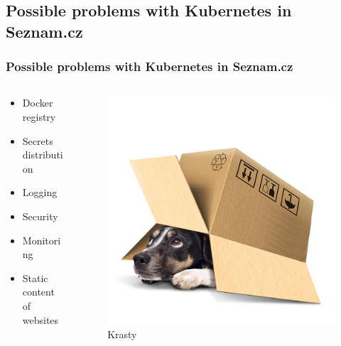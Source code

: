   \subsection*{Possible problems with Kubernetes in Seznam.cz}
    \begin{frame}
      \frametitle{Possible problems with Kubernetes in Seznam.cz}
      \begin{columns}
        \begin{column}{0.48\textwidth}
            \begin{itemize}
              \item Docker registry
              \item Secrets distribution
              \item Logging
              \item Security
              \item Monitoring
              \item Static content of websites
            \end{itemize}
          \end{column}  
          \begin{column}{0.48\textwidth}
            \begin{figure}[htb]
    				  \begin{center}
    					  \includegraphics[width=\textwidth]{img/pes-krasty-seznam-15.png}
    					  \caption{Krasty \cite{krasty}}
    				  \end{center}
    			  \end{figure}
          \end{column}
        \end{columns}
    \end{frame}
    

